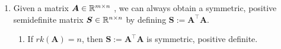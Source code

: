 \begin{enumerate}
    \item
    \begin{theorem}
        Given a matrix $\bm{A} \in \mathbb{R}^{m\times n}$ , we can always obtain a symmetric, positive semidefinite matrix $\bm{S} \in \mathbb{R}^{n\times n}$ by defining $\bm{S} := \bm{A}^\top \bm{A}$.
        \hfill \cite{mfml/book/mml/Deisenroth-Faisal-Ong}
    \end{theorem}
    \begin{enumerate}
        \item If $rk(\bm{A}) = n$, then $\bm{S} := \bm{A}^\top \bm{A}$ is symmetric, positive definite.
        \hfill \cite{mfml/book/mml/Deisenroth-Faisal-Ong}
    \end{enumerate}
\end{enumerate}














